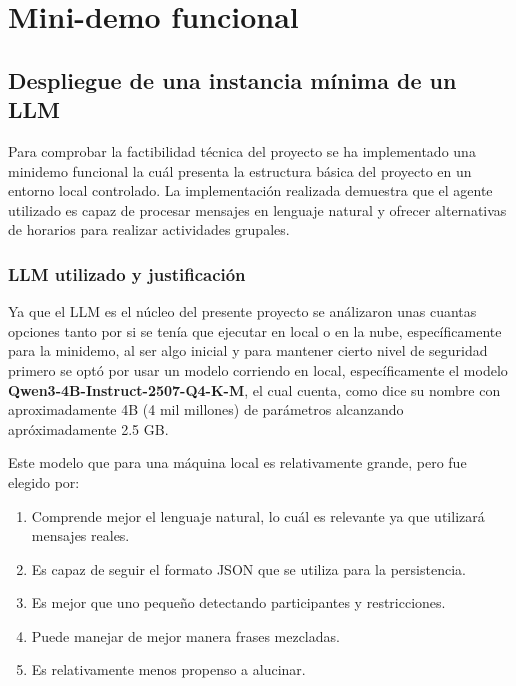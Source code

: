 \section{Mini-demo funcional}

\subsection{Despliegue de una instancia mínima de un LLM}

Para comprobar la factibilidad técnica del proyecto se ha implementado una minidemo funcional la cuál presenta la estructura básica del proyecto en un entorno local controlado. La implementación realizada demuestra que el agente utilizado es capaz de procesar mensajes en lenguaje natural y ofrecer alternativas de horarios para realizar actividades grupales.


\subsubsection{LLM utilizado y justificación}

Ya que el LLM es el núcleo del presente proyecto se análizaron unas cuantas opciones tanto por si se tenía que ejecutar en local o en la nube, específicamente para la minidemo, al ser algo inicial y para mantener cierto nivel de seguridad primero se optó por usar un modelo corriendo en local, específicamente el modelo \textbf{Qwen3-4B-Instruct-2507-Q4-K-M}, el cual cuenta, como dice su nombre con aproximadamente 4B (4 mil millones) de parámetros alcanzando apróximadamente 2.5 GB.

Este modelo que para una máquina local es relativamente grande, pero fue elegido por:
\begin{enumerate}
    \item Comprende mejor el lenguaje natural, lo cuál es relevante ya que utilizará mensajes reales.
    
    \item Es capaz de seguir el formato JSON que se utiliza para la persistencia.
    
    \item Es mejor que uno pequeño detectando participantes y restricciones.
    
    \item Puede manejar de mejor manera frases mezcladas.
    
    \item Es relativamente menos propenso a alucinar.
\end{enumerate}

